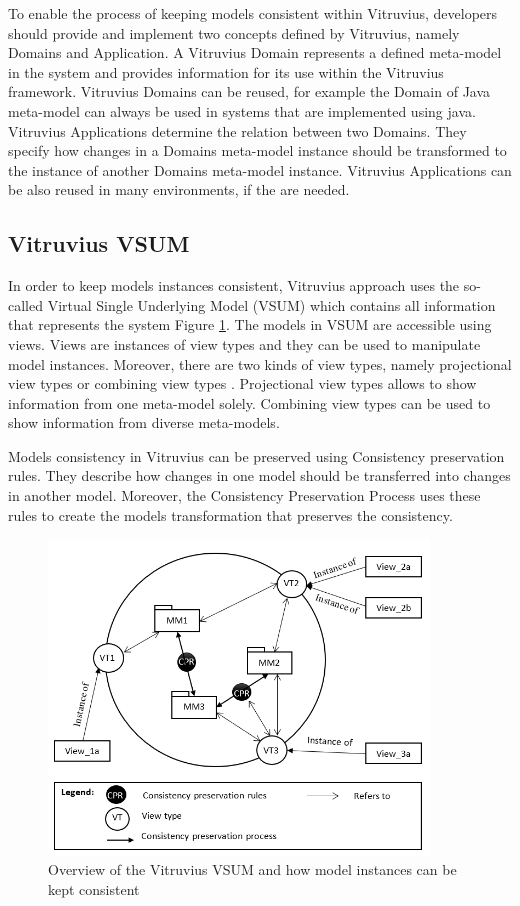To enable the process of keeping models consistent within Vitruvius, developers should provide and implement two concepts defined by Vitruvius, namely Domains and Application. A Vitruvius Domain represents a defined meta-model in the system and provides information for its use within the Vitruvius framework. Vitruvius Domains can be reused, for example the Domain of Java meta-model can always be used in systems that are implemented using java. Vitruvius Applications determine the relation between two Domains. They specify how changes in a Domains meta-model instance should be transformed to the instance of another Domains meta-model instance. Vitruvius Applications can be also reused in many environments, if the are needed.

\subsection{Vitruvius VSUM}
\label{sec:Vitruvius VSUM}
In order to keep models instances consistent, Vitruvius approach uses the so-called Virtual Single Underlying Model (VSUM) which contains all information that represents the system Figure \ref{fig:vitruv_vsum}. The models in VSUM are accessible using views. Views are instances of view types and they can be used to manipulate model instances. Moreover, there are two kinds of view types, namely projectional view types or combining view types \cite{burger2013flexible}. Projectional view types allows to show information from one meta-model solely. Combining view types can be used to show information from diverse meta-models.

Models consistency in Vitruvius can be preserved using Consistency preservation rules. They describe how changes in one model should be transferred into changes in another model. Moreover, the Consistency Preservation Process uses these rules to create the models transformation that preserves the consistency.


\begin{figure}[h]
\centering
\includegraphics[width=0.9\textwidth]{figures/vitruv_vsum}
\caption{Overview of the Vitruvius VSUM and how model instances can be kept consistent}
\label{fig:vitruv_vsum}
\end{figure}

